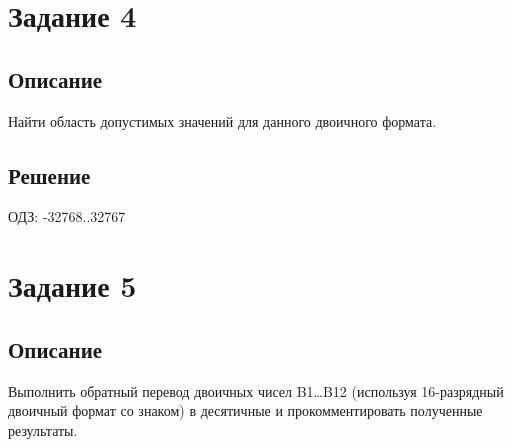 \documentclass[11pt]{article}
\begin{document}
\section{Задание 4}
\label{sec:org106862f}
\subsection{Описание}
\label{sec:org6cb83b3}
Найти область допустимых значений для данного двоичного формата.

\subsection{Решение}
\label{sec:org01418aa}

ОДЗ: -32768..32767

\section{Задание 5}
\label{sec:orgb0c7335}
\subsection{Описание}
\label{sec:orgb6953ab}
Выполнить обратный перевод двоичных чисел B1…B12 (используя 16-разрядный двоичный формат со знаком) в десятичные и прокомментировать полученные результаты.
\end{document}
